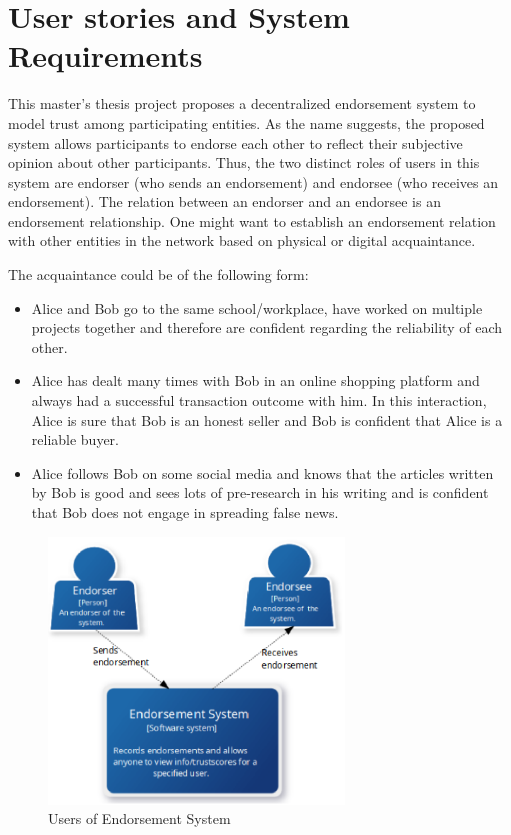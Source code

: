 \section{User stories and System Requirements} \label{ch:UserStories}
This master's thesis project proposes a decentralized endorsement system to
model trust among participating entities. As the name suggests, the proposed
system allows participants to endorse each other to reflect their subjective
opinion about other participants. Thus, the two distinct roles of users in this
system are endorser (who sends an endorsement) and endorsee (who receives an
endorsement). The relation between an endorser and an endorsee is an
endorsement relationship. One might want to establish an endorsement relation
with other entities in the network based on physical or digital acquaintance.
\par
The acquaintance could be of the following form: 
\begin{itemize}
	\item Alice and Bob go to the same school/workplace, have worked on
		multiple projects together and therefore are confident regarding the
		reliability of each other.
	\item Alice has dealt many times with Bob in an online shopping platform
		and always had a successful transaction outcome with him. In this
		interaction, Alice is sure that Bob is an honest seller and Bob is
		confident that Alice is a reliable buyer.
	\item Alice follows Bob on some social media and knows that the articles
		written by Bob is good and sees lots of pre-research in his writing and
		is confident that Bob does not engage in spreading false news. 
\end{itemize}
\begin{figure}
	\centering
	\includegraphics[width=0.7\textwidth]{Images/ContextLayer.eps}
	\caption{Users of Endorsement System}
	\label{fig:context}
\end{figure}
